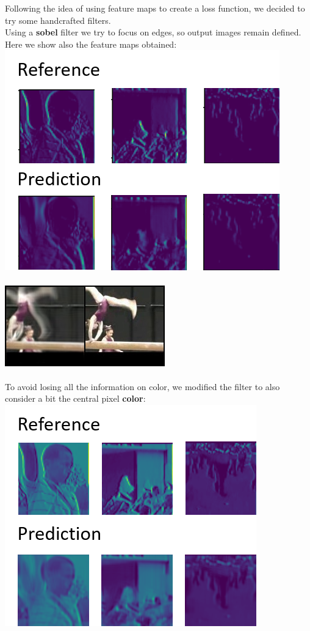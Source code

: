 \documentclass[11pt, a4paper]{article}
\begin{document}
	Following the idea of using feature maps to create a loss function, we decided to try some handcrafted filters. \\
	Using a \textbf{sobel} filter we try to focus on edges, so output images remain defined. Here we show also the feature maps obtained: \\
	\includegraphics{map_sobel}\\ \\
	\includegraphics{sobel}\\ \\
	To avoid losing all the information on color, we modified the filter to also consider a bit the central pixel \textbf{color}: \\
	\includegraphics{sobel_color_map}\\ \\
\end{document}
